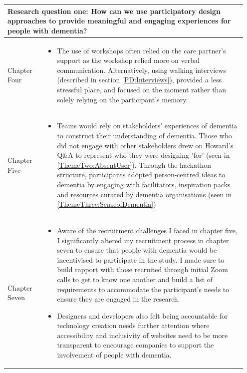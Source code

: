 \begin{table}[htp]
    \centering
    \begin{tabular}{p{0.15\linewidth} | p{0.8\linewidth}}
      \multicolumn{2}{p{0.95\linewidth}}{\textbf{Research question one: How can we use participatory design approaches to provide meaningful and engaging experiences for people with dementia?}} 
      \\   \hline
      Chapter Four &
      \begin{itemize}
          \item The use of workshops often relied on the care partner's support as the workshop relied more on verbal communication. Alternatively, using walking interviews (described in section \ref{PD:Interviews}), provided a less stressful place, and focused on the moment rather than solely relying on the participant's memory.
      \end{itemize}
 \\   \hline
    Chapter Five &
    \begin{itemize}
          \item Teams would rely on stakeholders' experiences of dementia to construct their understanding of dementia. Those who did not engage with other stakeholders drew on Howard's Q\&A to represent who they were designing 'for' (seen in \ref{ThemeTwo:AbsentUser}). Through the hackathon structure, participants adopted person-centred ideas to dementia by engaging with facilitators, inspiration packs and resources curated by dementia organisations (seen in \ref{ThemeThree:SenseofDementia})

      \end{itemize}
       \\ \hline
        Chapter Seven &
      \begin{itemize}
          \item Aware of the recruitment challenges I faced in chapter five, I significantly altered my recruitment process in chapter seven to ensure that people with dementia would be incentivised to participate in the study. I made sure to build rapport with those recruited through initial Zoom calls to get to know one another and build a list of requirements to accommodate the participant's needs to ensure they are engaged in the research.

          \item  Designers and developers also felt being accountable for technology creation needs further attention where accessibility and inclusivity of websites need to be more transparent to encourage companies to support the involvement of people with dementia.
      \end{itemize}
    \end{tabular}
    \label{chaptersRQ1}
\end{table}

